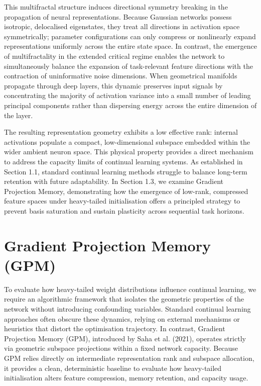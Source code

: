 \documentclass[11pt,oneside]{report}
\begin{document}
This multifractal structure induces directional symmetry breaking in the propagation of neural representations. Because Gaussian networks possess isotropic, delocalised eigenstates, they treat all directions in activation space symmetrically; parameter configurations can only compress or nonlinearly expand representations uniformly across the entire state space. In contrast, the emergence of multifractality in the extended critical regime enables the network to simultaneously balance the expansion of task-relevant feature directions with the contraction of uninformative noise dimensions. When geometrical manifolds propagate through deep layers, this dynamic preserves input signals by concentrating the majority of activation variance into a small number of leading principal components rather than dispersing energy across the entire dimension of the layer.

The resulting representation geometry exhibits a low effective rank: internal activations populate a compact, low-dimensional subspace embedded within the wider ambient neuron space. This physical property provides a direct mechanism to address the capacity limits of continual learning systems. As established in Section 1.1, standard continual learning methods struggle to balance long-term retention with future adaptability. In Section 1.3, we examine Gradient Projection Memory, demonstrating how the emergence of low-rank, compressed feature spaces under heavy-tailed initialisation offers a principled strategy to prevent basis saturation and sustain plasticity across sequential task horizons.
\section{Gradient Projection Memory (GPM)}
To evaluate how heavy-tailed weight distributions influence continual learning, we require an algorithmic framework that isolates the geometric properties of the network without introducing confounding variables. Standard continual learning approaches often obscure these dynamics, relying on external mechanisms or heuristics that distort the optimisation trajectory. In contrast, Gradient Projection Memory (GPM), introduced by Saha et al. (2021), operates strictly via geometric subspace projections within a fixed network capacity. Because GPM relies directly on intermediate representation rank and subspace allocation, it provides a clean, deterministic baseline to evaluate how heavy-tailed initialisation alters feature compression, memory retention, and capacity usage.
\end{document}
